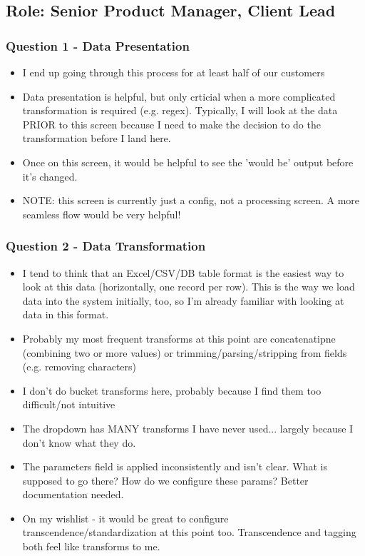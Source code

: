 \documentclass[12pt,letterpaper]{article}
\begin{document}
\subsection*{Role: Senior Product Manager, Client Lead}
\subsubsection*{Question 1 - Data Presentation} 

\begin{itemize}
    \item I end up going through this process for at least half of our customers
    \item Data presentation is helpful, but only crticial when a more complicated transformation is required (e.g. regex). Typically, I will look at the data PRIOR to this screen because I need to make the decision to do the transformation before I land here. 
    \item Once on this screen, it would be helpful to see the 'would be' output before it's changed.
    \item NOTE: this screen is currently just a config, not a processing screen. A more seamless flow would be very helpful!
\end{itemize}

\subsubsection*{Question 2 - Data Transformation}
\begin{itemize}
    \item I tend to think that an Excel/CSV/DB table format is the easiest way to look at this data (horizontally, one record per row). This is the way we load data into the system initially, too, so I'm already familiar with looking at data in this format. 
    \item Probably my most frequent transforms at this point are concatenatipne (combining two or more values) or trimming/parsing/stripping from fields (e.g. removing characters)
    \item I don't do bucket transforms here, probably because I find them too difficult/not intuitive
    \item The dropdown has MANY transforms I have never used... largely because I don't know what they do. 
    \item The parameters field is applied inconsistently and isn't clear. What is supposed to go there? How do we configure these params? Better documentation needed.
    \item On my wishlist - it would be great to configure transcendence/standardization at this point too. Transcendence and tagging both feel like transforms to me.
\end{itemize}
\end{document}
